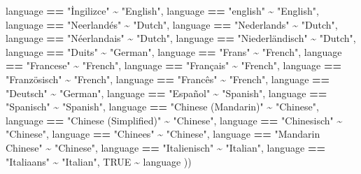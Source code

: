 \documentclass[11pt,]{article}
\newenvironment{Shaded}{\begin{snugshade}}{\end{snugshade}}
\newcommand{\ConstantTok}[1]{\textcolor[rgb]{0.56,0.35,0.01}{#1}}
\newcommand{\NormalTok}[1]{#1}
\newcommand{\SpecialCharTok}[1]{\textcolor[rgb]{0.81,0.36,0.00}{\textbf{#1}}}
\newcommand{\StringTok}[1]{\textcolor[rgb]{0.31,0.60,0.02}{#1}}
\begin{document}
\begin{Shaded}
\begin{Highlighting}[]
\NormalTok{    language }\SpecialCharTok{==} \StringTok{"İngilizce"} \SpecialCharTok{\textasciitilde{}} \StringTok{"English"}\NormalTok{,}
\NormalTok{    language }\SpecialCharTok{==} \StringTok{"english"} \SpecialCharTok{\textasciitilde{}} \StringTok{"English"}\NormalTok{,}
\NormalTok{    language }\SpecialCharTok{==} \StringTok{"Neerlandés"} \SpecialCharTok{\textasciitilde{}} \StringTok{"Dutch"}\NormalTok{,}
\NormalTok{    language }\SpecialCharTok{==} \StringTok{"Nederlands"} \SpecialCharTok{\textasciitilde{}} \StringTok{"Dutch"}\NormalTok{,}
\NormalTok{    language }\SpecialCharTok{==} \StringTok{"Néerlandais"} \SpecialCharTok{\textasciitilde{}} \StringTok{"Dutch"}\NormalTok{, }
\NormalTok{    language }\SpecialCharTok{==} \StringTok{"Niederländisch"} \SpecialCharTok{\textasciitilde{}} \StringTok{"Dutch"}\NormalTok{, }
\NormalTok{    language }\SpecialCharTok{==} \StringTok{"Duits"} \SpecialCharTok{\textasciitilde{}} \StringTok{"German"}\NormalTok{,}
\NormalTok{    language }\SpecialCharTok{==} \StringTok{"Frans"} \SpecialCharTok{\textasciitilde{}} \StringTok{"French"}\NormalTok{,}
\NormalTok{    language }\SpecialCharTok{==} \StringTok{"Francese"} \SpecialCharTok{\textasciitilde{}} \StringTok{"French"}\NormalTok{,}
\NormalTok{    language }\SpecialCharTok{==} \StringTok{"Français"} \SpecialCharTok{\textasciitilde{}} \StringTok{"French"}\NormalTok{,}
\NormalTok{    language }\SpecialCharTok{==} \StringTok{"Französisch"} \SpecialCharTok{\textasciitilde{}} \StringTok{"French"}\NormalTok{,}
\NormalTok{    language }\SpecialCharTok{==} \StringTok{"Francês"} \SpecialCharTok{\textasciitilde{}} \StringTok{"French"}\NormalTok{,}
\NormalTok{    language }\SpecialCharTok{==} \StringTok{"Deutsch"} \SpecialCharTok{\textasciitilde{}} \StringTok{"German"}\NormalTok{,}
\NormalTok{    language }\SpecialCharTok{==} \StringTok{"Español"} \SpecialCharTok{\textasciitilde{}} \StringTok{"Spanish"}\NormalTok{, }
\NormalTok{    language }\SpecialCharTok{==} \StringTok{"Spanisch"} \SpecialCharTok{\textasciitilde{}} \StringTok{"Spanish"}\NormalTok{,     }
\NormalTok{    language }\SpecialCharTok{==} \StringTok{"Chinese (Mandarin)"} \SpecialCharTok{\textasciitilde{}} \StringTok{"Chinese"}\NormalTok{, }
\NormalTok{    language }\SpecialCharTok{==} \StringTok{"Chinese (Simplified)"} \SpecialCharTok{\textasciitilde{}} \StringTok{"Chinese"}\NormalTok{, }
\NormalTok{    language }\SpecialCharTok{==} \StringTok{"Chinesisch"} \SpecialCharTok{\textasciitilde{}} \StringTok{"Chinese"}\NormalTok{, }
\NormalTok{    language }\SpecialCharTok{==} \StringTok{"Chinees"} \SpecialCharTok{\textasciitilde{}} \StringTok{"Chinese"}\NormalTok{, }
\NormalTok{    language }\SpecialCharTok{==} \StringTok{"Mandarin Chinese"} \SpecialCharTok{\textasciitilde{}} \StringTok{"Chinese"}\NormalTok{, }
\NormalTok{    language }\SpecialCharTok{==} \StringTok{"Italienisch"} \SpecialCharTok{\textasciitilde{}} \StringTok{"Italian"}\NormalTok{,}
\NormalTok{    language }\SpecialCharTok{==} \StringTok{"Italiaans"}  \SpecialCharTok{\textasciitilde{}} \StringTok{"Italian"}\NormalTok{,}
    \ConstantTok{TRUE} \SpecialCharTok{\textasciitilde{}}\NormalTok{ language}
\NormalTok{  ))}
\end{Highlighting}
\end{Shaded}
\end{document}
